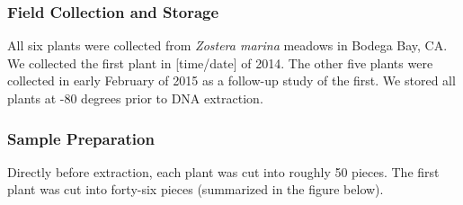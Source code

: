 
\subsubsection{Field Collection and Storage}

All six plants were collected from \textit{Zostera marina} meadows in Bodega Bay, CA. We collected the first plant in [time/date] of 2014. The other five plants were collected in early February of 2015 as a follow-up study of the first. We stored all plants at -80 degrees prior to DNA extraction. 

\subsubsection{Sample Preparation}

Directly before extraction, each plant was cut into roughly 50 pieces. The first plant was cut into forty-six pieces (summarized in the figure below). 